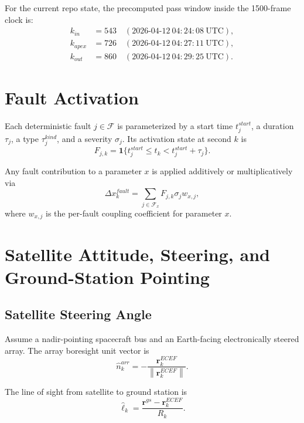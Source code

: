 \documentclass[11pt]{article}
\newcommand{\vect}[1]{\mathbf{#1}}
\newcommand{\norm}[1]{\left\lVert #1 \right\rVert}
\begin{document}
For the current repo state, the precomputed pass window inside the 1500-frame clock is:
\begin{align}
  k_{in} &= 543 \quad (2026\text{-}04\text{-}12\ 04{:}24{:}08 \ \mathrm{UTC}), \\
  k_{apex} &= 726 \quad (2026\text{-}04\text{-}12\ 04{:}27{:}11 \ \mathrm{UTC}), \\
  k_{out} &= 860 \quad (2026\text{-}04\text{-}12\ 04{:}29{:}25 \ \mathrm{UTC}).
\end{align}

\section{Fault Activation}

Each deterministic fault $j \in \mathcal{F}$ is parameterized by a start time
$t^{start}_j$, a duration $\tau_j$, a type $\tau^{kind}_j$, and a severity $\sigma_j$.
Its activation state at second $k$ is
\begin{equation}
  F_{j,k}
  =
  \mathbf{1}\{t^{start}_j \le t_k < t^{start}_j + \tau_j\}.
\end{equation}

Any fault contribution to a parameter $x$ is applied additively or multiplicatively via
\begin{equation}
  \Delta x^{fault}_k = \sum_{j \in \mathcal{F}_x} F_{j,k} \sigma_j w_{x,j},
\end{equation}
where $w_{x,j}$ is the per-fault coupling coefficient for parameter $x$.

\section{Satellite Attitude, Steering, and Ground-Station Pointing}

\subsection{Satellite Steering Angle}

Assume a nadir-pointing spacecraft bus and an Earth-facing electronically steered array.
The array boresight unit vector is
\begin{equation}
  \hat{n}^{arr}_k = - \frac{\vect{r}^{ECEF}_k}{\norm{\vect{r}^{ECEF}_k}}.
\end{equation}

The line of sight from satellite to ground station is
\begin{equation}
  \hat{\ell}_k = \frac{\vect{r}^{gs} - \vect{r}^{ECEF}_k}{R_k}.
\end{equation}
\end{document}
